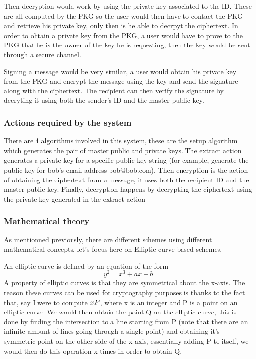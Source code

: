 \documentclass[conference]{IEEEtran}
\begin{document}
Then decryption would work by using the private key associated to the ID. These are all 
computed by the PKG so the user would then have to contact the PKG and retrieve his private key,
only then is he able to decrpyt the ciphertext. In order to obtain a private key from the PKG, a user 
would have to prove to the PKG that he is the owner of the key he is requesting, then the key would be sent 
through a secure channel.


Signing a message would be very similar, a user would obtain his private key from the PKG
and encrypt the message using the key and send the signature along with the ciphertext.
The recipient can then verify the signature by decryting it using both the sender's ID and the 
master public key.


\subsubsection{Actions required by the system}
There are 4 algorithms involved in this system, these are
the setup algorithm which generates the pair of master public and private
keys. The extract action generates a private key for a specific public key string (for example,
generate the public key for bob's email address bob@bob.com).
Then encryption is the action of obtaining the ciphertext from a message, it uses both the 
recipient ID and the master public key. Finally, decryption happens by decrypting the ciphertext 
using the private key generated in the extract action.


\subsubsection{Mathematical theory}
As mentionned previously, there are different schemes using different mathematical concepts,
let's focus here on Elliptic curve based schemes. 


An elliptic curve is defined by an equation of the form 
\begin{equation*}
    y^2 = x^3 + ax + b
\end{equation*}
A property of elliptic curves is that they are symmetrical about the x-axis. The reason these
curves can be used for cryptography purposes is thanks to the fact that, say I were to compute 
$x\*P$, where x is an integer and P is a point on an elliptic curve. We would then obtain the point Q on the 
elliptic curve, this is done by finding the intersection to a line starting from P 
(note that there are an infinite amount of lines going through a single point) and obtaining it's 
symmetric point on the other side of the x axis, essentially adding P to itself, we would then do this 
operation x times in order to obtain Q.
\end{document}
